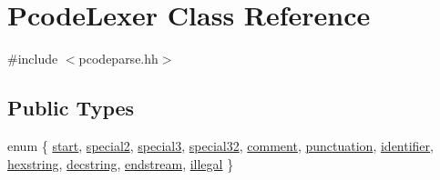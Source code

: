 \hypertarget{class_pcode_lexer}{}\section{Pcode\+Lexer Class Reference}
\label{class_pcode_lexer}


{\ttfamily \#include $<$pcodeparse.\+hh$>$}

\subsection*{Public Types}
\begin{DoxyCompactItemize}
\item 
enum \{ \newline
\mbox{\hyperlink{class_pcode_lexer_a4f521efac3b64a1925adaac3a4a952f3a68860f84706fc434635595be20fa24f7}{start}}, 
\mbox{\hyperlink{class_pcode_lexer_a4f521efac3b64a1925adaac3a4a952f3a8b01474ab5dd32122fe57f17b246aa5a}{special2}}, 
\mbox{\hyperlink{class_pcode_lexer_a4f521efac3b64a1925adaac3a4a952f3af1084aea60ce25d4b22ac007c4139063}{special3}}, 
\mbox{\hyperlink{class_pcode_lexer_a4f521efac3b64a1925adaac3a4a952f3acfa5add79b6913b18e862de328dc9d67}{special32}}, 
\newline
\mbox{\hyperlink{class_pcode_lexer_a4f521efac3b64a1925adaac3a4a952f3a000de046dd94173918964693095c3caa}{comment}}, 
\mbox{\hyperlink{class_pcode_lexer_a4f521efac3b64a1925adaac3a4a952f3a4dd258c455edc8f35a33ab844244a648}{punctuation}}, 
\mbox{\hyperlink{class_pcode_lexer_a4f521efac3b64a1925adaac3a4a952f3a998606ab7ef19b46c4f5ade1eefcb136}{identifier}}, 
\mbox{\hyperlink{class_pcode_lexer_a4f521efac3b64a1925adaac3a4a952f3a9b9e1c21aec05f1fb4707610c39f2d99}{hexstring}}, 
\newline
\mbox{\hyperlink{class_pcode_lexer_a4f521efac3b64a1925adaac3a4a952f3a80b01dd7a33cbcca8a45375aaa414a2a}{decstring}}, 
\mbox{\hyperlink{class_pcode_lexer_a4f521efac3b64a1925adaac3a4a952f3ae67cbc3cd3d967df6d66aa3e6879bfbc}{endstream}}, 
\mbox{\hyperlink{class_pcode_lexer_a4f521efac3b64a1925adaac3a4a952f3a8f5169474594ef3b1f7ca4d2ffd426ca}{illegal}}
 \}
\end{DoxyCompactItemize}
